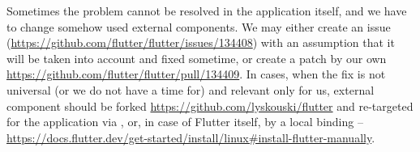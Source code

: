 \noindent Sometimes the problem cannot be resolved in the application itself, and we have to change somehow used 
external components. We may either create an issue 
(\href{https://github.com/flutter/flutter/issues/134408}{https://github.com/flutter/flutter/issues/134408}) 
with an assumption that it will be taken into account and fixed sometime, or create a patch by our own 
\href{https://github.com/flutter/flutter/pull/134409}{https://github.com/flutter/flutter/pull/134409}. In cases, when 
the fix is not universal (or we do not have a time for) and relevant only for us, external component should be forked 
\href{https://github.com/lyskouski/flutter}{https://github.com/lyskouski/flutter} and re-targeted for the application
via , or, in case of Flutter itself, by a local binding -- 
\href{https://docs.flutter.dev/get-started/install/linux#install-flutter-manually}{https://docs.flutter.dev/get-started/install/linux\#install-flutter-manually}.
